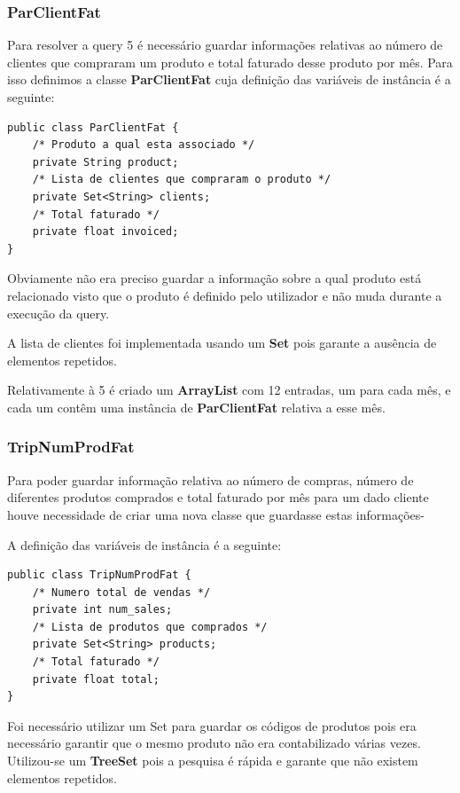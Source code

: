 \documentclass[10pt] {article}
\begin{document}
\subsubsection{ParClientFat}

Para resolver a query 5 é necessário guardar informações relativas ao número de clientes que compraram um produto e total faturado desse produto por mês. Para isso definimos a classe \textbf{ParClientFat} cuja definição das variáveis de
instância é a seguinte:

\begin{lstlisting}
public class ParClientFat {
	/* Produto a qual esta associado */
	private String product;
	/* Lista de clientes que compraram o produto */
	private Set<String> clients;
	/* Total faturado */
	private float invoiced;
}
\end{lstlisting}


Obviamente não era preciso guardar a informação sobre a qual produto está relacionado visto que o produto é definido pelo utilizador e não muda durante a execução da query.

A lista de clientes foi implementada usando um \textbf{Set} pois garante a ausência de elementos repetidos.

Relativamente à 5 é criado um \textbf{ArrayList} com 12 entradas, um para cada mês, e cada um contêm uma instância de \textbf{ParClientFat} relativa a esse mês.

\subsubsection{TripNumProdFat}

Para poder guardar informação relativa ao número de compras, número de diferentes produtos comprados e total faturado por mês para um dado cliente houve necessidade de criar uma nova classe que guardasse estas informações-

A definição das variáveis de instância é a seguinte:

\begin{lstlisting}
public class TripNumProdFat {
	/* Numero total de vendas */
	private int num_sales;
	/* Lista de produtos que comprados */
	private Set<String> products;
	/* Total faturado */
	private float total;
}
\end{lstlisting}


Foi necessário utilizar um Set para guardar os códigos de produtos pois era necessário garantir que o mesmo produto não era contabilizado várias vezes.
Utilizou-se um \textbf{TreeSet} pois a pesquisa é rápida e garante que não existem elementos repetidos.
\end{document}
